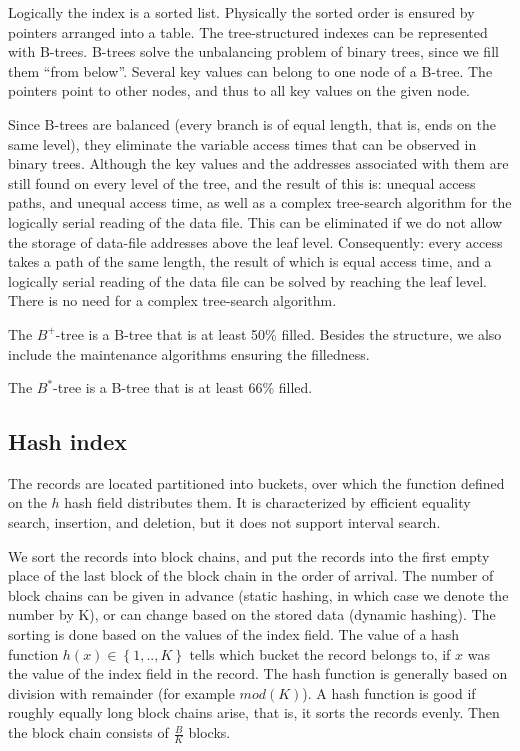 \documentclass[margin=0px]{article}
\begin{document}
Logically the index is a sorted list. Physically the sorted order is ensured by pointers arranged into a table.
The tree-structured indexes can be represented with B-trees. B-trees solve the unbalancing problem of binary trees,
since we fill them ``from below''. Several key values can belong to one node of a B-tree.
The pointers point to other nodes, and thus to all key values on the given
node.

Since B-trees are balanced (every branch is of equal length, that is, ends on the same level),
they eliminate the variable access times that can be observed in binary trees. Although the key values and the
addresses associated with them are still found on every level of the tree, and the result of this is:
unequal access paths, and unequal access time, as well as a complex tree-search algorithm for the
logically serial reading of the data file. This can be eliminated if we do not allow the storage of data-file addresses
above the leaf level. Consequently: every access takes a path of the same length,
the result of which is equal access time, and a logically serial reading of the data file can be solved by reaching the leaf
level. There is no need for a complex tree-search algorithm.

The $B^{+}$-tree is a B-tree that is at least 50\% filled. Besides the structure, we also include the
maintenance algorithms ensuring the filledness.

The $B^{*}$-tree is a B-tree that is at least 66\% filled.

\subsection{Hash index}

The records are located partitioned into buckets, over which the function defined on the $h$ hash field
distributes them. It is characterized by efficient equality search, insertion, and deletion, but it does not support
interval search.

We sort the records into block chains, and put the records into the first empty place of the last block of the block chain
in the order of arrival. The number of block chains can be given in advance
(static hashing, in which case we denote the number by K), or can change based on the stored data (dynamic hashing).
The sorting is done based on the values of the index field. The value of a hash function $h(x) \in \left\{1,..,K\right\}$ tells
which bucket the record belongs to, if $x$ was the value of the index field in the record. The hash function
is generally based on division with remainder (for example $mod(K)$). A hash function is good if roughly equally
long block chains arise, that is, it sorts the records evenly. Then the block chain consists of $\frac{B}{K}$ blocks.\\
\end{document}
